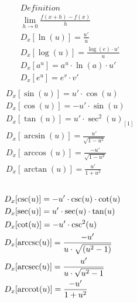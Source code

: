               \textbf{\\}
              \begin{vwcol}[widths={0.2,1.6,0.6}, sep=.5cm, justify=flush,rule=2pt,indent=0em]
                \begin{align*}
                  &Definition\\
                  &\lim_{{h \to 0}} \frac{f(x+h) - f(x)}{h}\\
                  &D_x[\ln(u)] = \frac{u'}{u} \\
                  &D_x[\log(u)] = \frac{\log(e) \cdot u'}{u} \\
                  &D_x[a^u] = a^u \cdot \ln(a) \cdot u' \\
                  &D_x[e^u]=e^v\cdot v'
                \end{align*}
                \begin{align*}
                  \\&D_x[\sin(u)] = u'\cdot \cos(u)
                  \\&D_x[\cos(u)] = -u'\cdot \sin(u)
                  \\&D_x[\tan(u)] = u'\cdot \sec^2(u)_{[1]}
                  \\&D_x[\arcsin(u)] = \frac{u'}{\sqrt{1-u^2}}
                  \\&D_x[\arccos(u)] = \frac{-u'}{\sqrt{1-u^2}}
                  \\&D_x[\arctan(u)] = \frac{u'}{1+u^2}
                \end{align*}
                \begin{align*}
                  \\&D_x[\csc(u)] = -u'\cdot \csc(u) \cdot \cot(u)
                  \\&D_x[\sec(u)] = u'\cdot \sec(u) \cdot \tan(u)
                  \\&D_x[\cot(u)] = -u'\cdot \csc^2(u)
                  \\&D_x[\operatorname{arccsc}(u)] = \frac{-u'}{u\cdot \sqrt{(u^2-1)}}
                  \\&D_x[\operatorname{arcsec}(u)] = \frac{u'}{u\cdot \sqrt{u^2-1}}
                  \\&D_x[\operatorname{arccot}(u)] = \frac{-u'}{1+u^2}
                \end{align*}
              \end{vwcol}

